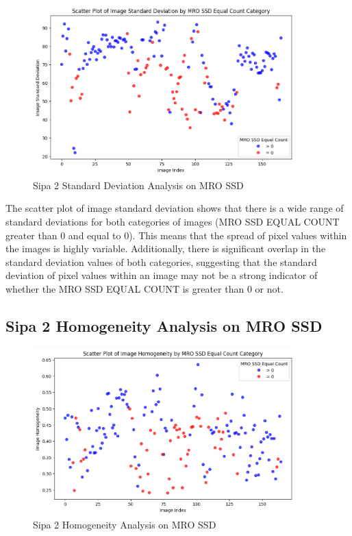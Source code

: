 \begin{figure}[ht]
    \centering
    \includegraphics[width=0.9\textwidth]{Figures/Results/sipa_02/sd.png}
    \caption[Sipa 2 Standard Deviation Analysis on MRO SSD]{Sipa 2 Standard Deviation Analysis on MRO SSD}
    \label{fig:Sipa 2 Standard Deviation Analysis on MRO SSD}
\end{figure}

The scatter plot of image standard deviation shows that there is a wide range of standard deviations for both categories of images (MRO SSD EQUAL COUNT greater than 0 and equal to 0). This means that the spread of pixel values within the images is highly variable. Additionally, there is significant overlap in the standard deviation values of both categories, suggesting that the standard deviation of pixel values within an image may not be a strong indicator of whether the MRO SSD EQUAL COUNT is greater than 0 or not.


\newpage

\subsection{Sipa 2 Homogeneity Analysis on MRO SSD}


\begin{figure}[ht]
    \centering
    \includegraphics[width=0.9\textwidth]{Figures/Results/sipa_02/homogeneity.png}
    \caption[Sipa 2 Homogeneity Analysis on MRO SSD]{Sipa 2 Homogeneity Analysis on MRO SSD}
    \label{fig:Sipa 2 Homogeneity Analysis on MRO SSD}
\end{figure}


